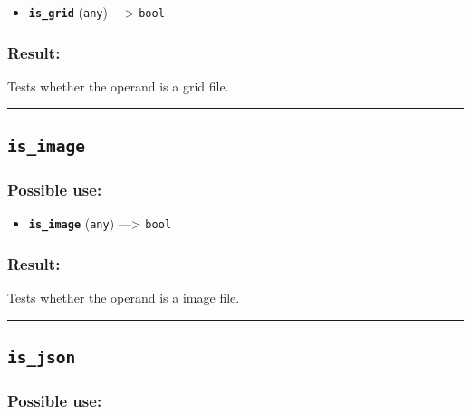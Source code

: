 \documentclass[]{book}
\providecommand{\tightlist}{%
  \setlength{\itemsep}{0pt}\setlength{\parskip}{0pt}}
\theoremstyle{definition}
\theoremstyle{definition}
\theoremstyle{definition}
\theoremstyle{remark}
\begin{document}
\begin{itemize}
\tightlist
\item
  \textbf{\texttt{is\_grid}} (\texttt{any}) ---\textgreater{}
  \texttt{bool}
\end{itemize}

\subsubsection{Result:}\label{result-283}

Tests whether the operand is a grid file.

\begin{center}\rule{0.5\linewidth}{\linethickness}\end{center}

\subsection{\texorpdfstring{\texttt{is\_image}}{is\_image}}\label{is_image}

\subsubsection{Possible use:}\label{possible-use-294}

\begin{itemize}
\tightlist
\item
  \textbf{\texttt{is\_image}} (\texttt{any}) ---\textgreater{}
  \texttt{bool}
\end{itemize}

\subsubsection{Result:}\label{result-284}

Tests whether the operand is a image file.

\begin{center}\rule{0.5\linewidth}{\linethickness}\end{center}

\subsection{\texorpdfstring{\texttt{is\_json}}{is\_json}}\label{is_json}

\subsubsection{Possible use:}\label{possible-use-295}
\end{document}
